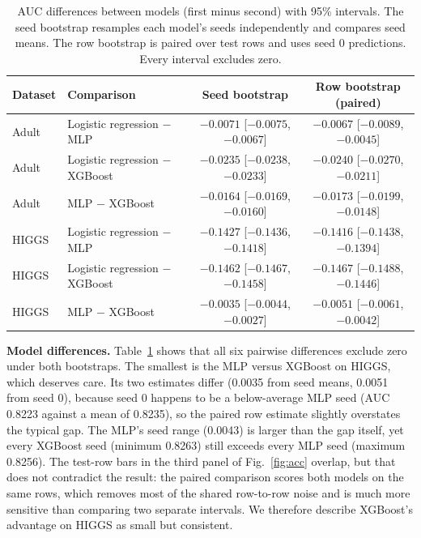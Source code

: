 \documentclass[conference]{IEEEtran}
\begin{document}
\begin{table}[t]
\caption{AUC differences between models (first minus second) with 95\% intervals. The seed bootstrap resamples each model's seeds independently and compares seed means. The row bootstrap is paired over test rows and uses seed 0 predictions. Every interval excludes zero.}
\label{tab:diff}
\centering
\begin{tabular}{llcc}
\toprule
Dataset & Comparison & Seed bootstrap & Row bootstrap (paired) \\
\midrule
Adult & Logistic regression $-$ MLP & $-0.0071$ [$-0.0075$, $-0.0067$] & $-0.0067$ [$-0.0089$, $-0.0045$] \\
Adult & Logistic regression $-$ XGBoost & $-0.0235$ [$-0.0238$, $-0.0233$] & $-0.0240$ [$-0.0270$, $-0.0211$] \\
Adult & MLP $-$ XGBoost & $-0.0164$ [$-0.0169$, $-0.0160$] & $-0.0173$ [$-0.0199$, $-0.0148$] \\
\midrule
HIGGS & Logistic regression $-$ MLP & $-0.1427$ [$-0.1436$, $-0.1418$] & $-0.1416$ [$-0.1438$, $-0.1394$] \\
HIGGS & Logistic regression $-$ XGBoost & $-0.1462$ [$-0.1467$, $-0.1458$] & $-0.1467$ [$-0.1488$, $-0.1446$] \\
HIGGS & MLP $-$ XGBoost & $-0.0035$ [$-0.0044$, $-0.0027$] & $-0.0051$ [$-0.0061$, $-0.0042$] \\
\bottomrule
\end{tabular}
\end{table}

\textbf{Model differences.} Table~\ref{tab:diff} shows that all six pairwise differences exclude zero under both bootstraps. The smallest is the MLP versus XGBoost on HIGGS, which deserves care. Its two estimates differ (0.0035 from seed means, 0.0051 from seed 0), because seed 0 happens to be a below-average MLP seed (AUC 0.8223 against a mean of 0.8235), so the paired row estimate slightly overstates the typical gap. The MLP's seed range (0.0043) is larger than the gap itself, yet every XGBoost seed (minimum 0.8263) still exceeds every MLP seed (maximum 0.8256). The test-row bars in the third panel of Fig.~\ref{fig:acc} overlap, but that does not contradict the result: the paired comparison scores both models on the same rows, which removes most of the shared row-to-row noise and is much more sensitive than comparing two separate intervals. We therefore describe XGBoost's advantage on HIGGS as small but consistent.
\end{document}
